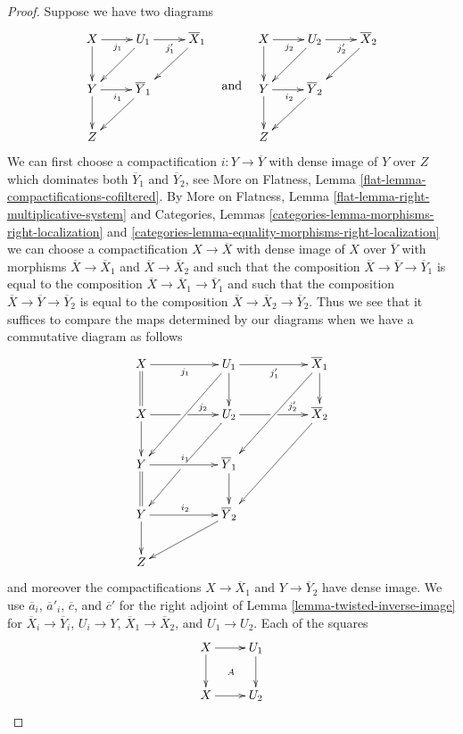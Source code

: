 \documentclass{stacks-project}
\theoremstyle{plain}
\theoremstyle{definition}
\theoremstyle{remark}
\numberwithin{equation}{subsection}
\begin{document}
\begin{proof}
\medskip\noindent
Suppose we have two diagrams
$$
\vcenter{
\xymatrix{
X \ar[r]_{j_1} \ar[d] & U_1 \ar[dl] \ar[r]_{j'_1} & \overline{X}_1 \ar[dl] \\
Y \ar[r]_{i_1} \ar[d] & \overline{Y}_1 \ar[dl] \\
Z
}
}
\quad\text{and}\quad
\vcenter{
\xymatrix{
X \ar[r]_{j_2} \ar[d] & U_2 \ar[dl] \ar[r]_{j'_2} & \overline{X}_2 \ar[dl] \\
Y \ar[r]_{i_2} \ar[d] & \overline{Y}_2 \ar[dl] \\
Z
}
}
$$
We can first choose a compactification $i : Y \to \overline{Y}$
with dense image of $Y$ over $Z$ which dominates both
$\overline{Y}_1$ and $\overline{Y}_2$,
see More on Flatness, Lemma \ref{flat-lemma-compactifications-cofiltered}.
By More on Flatness, Lemma \ref{flat-lemma-right-multiplicative-system} and
Categories, Lemmas \ref{categories-lemma-morphisms-right-localization} and
\ref{categories-lemma-equality-morphisms-right-localization}
we can choose a compactification $X \to \overline{X}$ with dense image of
$X$ over $\overline{Y}$ with morphisms $\overline{X} \to \overline{X}_1$
and $\overline{X} \to \overline{X}_2$ and such that the composition
$\overline{X} \to \overline{Y} \to \overline{Y}_1$ is equal to
the composition $\overline{X} \to \overline{X}_1 \to \overline{Y}_1$
and such that the composition
$\overline{X} \to \overline{Y} \to \overline{Y}_2$ is equal to
the composition $\overline{X} \to \overline{X}_2 \to \overline{Y}_2$.
Thus we see that it suffices to compare the maps
determined by our diagrams when we have a commutative diagram
as follows
$$
\xymatrix{
X \ar[rr]_{j_1} \ar@{=}[d] & &
U_1 \ar[d] \ar[ddll] \ar[rr]_{j'_1} & &
\overline{X}_1 \ar[d] \ar[ddll] \\
X \ar'[r][rr]^-{j_2} \ar[d] & &
U_2 \ar'[dl][ddll] \ar'[r][rr]^-{j'_2} & &
\overline{X}_2 \ar[ddll] \\
Y \ar[rr]^{i_1} \ar@{=}[d] & & \overline{Y}_1 \ar[d] \\
Y \ar[rr]^{i_2} \ar[d] & & \overline{Y}_2 \ar[dll] \\
Z
}
$$
and moreover the compactifications $X \to \overline{X}_1$ and
$Y \to \overline{Y}_2$ have dense image.
We use $\overline{a}_i$, $\overline{a}'_i$, $\overline{c}$, and
$\overline{c}'$ for the
right adjoint of Lemma \ref{lemma-twisted-inverse-image} for
$\overline{X}_i \to \overline{Y}_i$, $U_i \to Y$,
$\overline{X}_1 \to \overline{X}_2$, and $U_1 \to U_2$.
Each of the squares
$$
\xymatrix{
X \ar[r] \ar[d] \ar@{}[dr]|A & U_1 \ar[d] \\
X \ar[r] & U_2
}$$
\end{proof}
\end{document}
